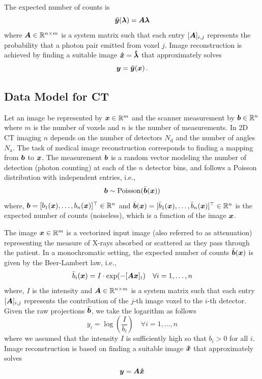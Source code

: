 The expected number of counts is
\begin{equation}\label{eq:PET}
\bm{\bar{y}}(\bm{\lambda}) = \bm{A} \bm{\lambda}
\end{equation}
where $\bm{A} \in \mathbb{R}^{n\times m}$ is a system matrix such that each entry $[\bm{A}]_{i,j}$ represents the probability that a photon pair emitted from voxel $j$. Image reconstruction is achieved by finding a suitable image $\bm{\hat{x}} = \bm{\hat{\lambda}}$ that approximately solves 
\begin{equation}\label{eq:pb1solve}
\bm{y} = \bm{\bar{y}}(\bm{x}) \, .
\end{equation} 


\subsection{Data Model for CT}
Let an image be represented by $\bm{x} \in \mathbb{R}^m$ and the scanner measurement by $\bm{b} \in \mathbb{R}^n$ where $m$ is the number of voxels and $n$ is the number of measurements. In \ac{2D} \ac{CT} imaging $n$ depends on the number of detectors $N_\mathrm{d}$ and the number of angles $N_\mathrm{a}$. The task of medical image reconstruction corresponds to finding a mapping from $\bm{b}$ to $\bm{x}$. The measurement $\bm{b}$ is a random vector modeling the number of detection (photon counting) at each of the $n$ detector bins, and follows a Poisson distribution with independent entries, i.e.,
\begin{equation}\label{eq:pCT}
\bm{b} \sim \mathrm{Poisson}(\bar{\bm{b}}(\bm{x}))
\end{equation}    
where, $\bm{b}  =  [b_1(\bm{x}),\dots,b_n(\bm{x})]^\top\in \mathbb{R}^n$ and $\bar{\bm{b}}(\bm{x})  =  [\bar{b}_1(\bm{x}),\dots,\bar{b}_n(\bm{x})]^\top\in \mathbb{R}^n$ is the expected number of counts (noiseless), which is a function of the image $\bm{x}$. 

The image $\bm{x}\in\mathbb{R}^m$ is a vectorized input image (also referred to as attenuation) representing the measure of X-rays absorbed or scattered as they pass through the patient. In a monochromatic setting, the expected number of counts $\bar{\bm{b}}(\bm{x})$  is given by the Beer-Lambert law, i.e.,
\begin{equation}\label{eq:CT}
\bar{b}_i(\bm{x}) = I \cdot \exp (-[\bm{A} \bm{x}]_i) \quad \forall i=1,\dots,n 
\end{equation}
where, $I$ is the intensity and $\bm{A} \in \mathbb{R}^{n\times m}$ is a system matrix such that each entry $[\bm{A}]_{i,j}$ represents the contribution of the $j$-th image voxel to the $i$-th detector. Given the raw projections $\bar{\bm{b}}$, we take the logarithm as follows
\begin{equation}
y_i = \log\left(\frac{I}{b_i}\right) \quad \forall i=1,\dots,n   
\end{equation}
where we assumed that the intensity $I$ is sufficiently high so that $b_i>0$ for all $i$. Image reconstruction is based on finding a suitable image $\bm{\hat{x}}$ that approximately solves 
\begin{equation}\label{eq:pb2solve}
\bm{y} = \bm{A} \bm{\hat{x}} 
\end{equation} 

